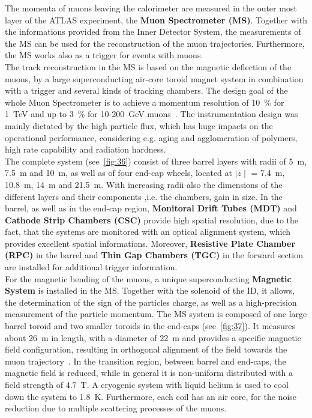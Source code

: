 \noindent The momenta of muons leaving the calorimeter are measured in the outer most layer of the ATLAS experiment, the \textbf{Muon Spectrometer (MS)}. Together with the informations provided from the Inner Detector System, the measurements of the MS can be used for the reconstruction of the muon trajectories. Furthermore, the MS works also as a trigger for events with muons.\\

\noindent The track reconstruction in the MS is based on the magnetic deflection of the muons, by a large superconducting air-core toroid magnet system in combination with a trigger and several kinds of tracking chambers. The design goal of the whole Muon Spectrometer is to achieve a momentum resolution of 10~\% for 1~TeV and up to 3~\% for 10-200~GeV muons~\cite{ATLAS:1999uwa}. The instrumentation design was mainly dictated by the high particle flux, which has huge impacts on the operational performance, considering e.g. aging and agglomeration of polymers, high rate capability and radiation hardness.\\  

\noindent The complete system (see~\cref{fig:36}) consist of three barrel layers with radii of  5~m, 7.5~m and 10~m, as well as of four end-cap wheels, located at $\mid z \mid$ = 7.4~m, 10.8~m, 14~m and 21.5~m. 
With increasing radii also the dimensions of the different layers and their components ,i.e. the chambers, gain in size. In the barrel, as well as in the end-cap region, \textbf{Monitoral Drift Tubes (MDT)} and \textbf{Cathode Strip Chambers (CSC)} provide high spatial resolution, due to the fact, that the systems are monitored with an optical alignment system, which provides excellent spatial informations. Moreover, \textbf{Resistive Plate Chamber (RPC)} in the barrel and \textbf{Thin Gap Chambers (TGC)} in the forward section are  installed for additional trigger information.\\



\noindent For the magnetic bending of the muons, a unique superconducting \textbf{Magnetic System} is installed in the MS. Together with the solenoid of the ID, it allows, the determination of the sign of the particles charge, as well as a high-precision measurement of the particle momentum. The MS system is composed of one large barrel toroid and two smaller toroids in the end-caps (see~\cref{fig:37}). It measures about 26~m in length, with a diameter of 22~m and provides a specific magnetic field configuration, resulting in orthogonal alignment of the field towards the muon trajectory~\cite{ATLAS:1999uwa}. In the transition region, between barrel and end-caps, the magnetic field is reduced, while in general it is  non-uniform distributed  with a field strength of 4.7~T.  A cryogenic system with liquid helium is used to cool down the system to 1.8~K. Furthermore,  each coil has an air core, for the noise reduction due to  multiple scattering processes of the muons. \\

